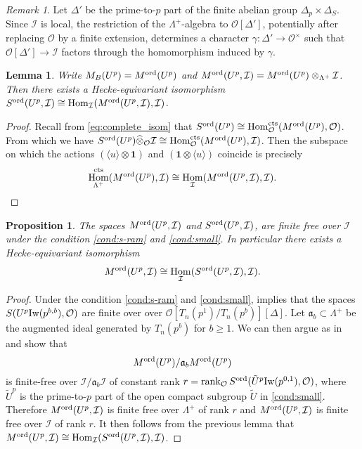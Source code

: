 \documentclass[leqno]{amsart}
\newtheorem{lem}[thm]{Lemma}
\newtheorem{prop}[thm]{Proposition}
\theoremstyle{definition}
\theoremstyle{remark}
\newtheorem{rem}[thm]{Remark}
\newcommand{\id}{\mathbf{1}}
\newcommand{\oo}{\mathcal{O}}
\DeclareMathOperator{\Hom}{Hom}
\newcommand{\cts}{\textnormal{cts}}
\newcommand{\fa}{\mathfrak{a}}
\newcommand{\Iw}{\textnormal{Iw}} %
\newcommand{\I}{\mathcal{I}} %
\newcommand{\ord}{\textnormal{ord}} %
\begin{document}
\begin{rem}
Let $\Delta'$ be the prime-to-$p$ part of the 
finite abelian group $\Delta_p\times \Delta_S$.
Since $\I$ is local,
the restriction of the $\Lambda^+$-algebra to $\oo[\Delta']$,
potentially after replacing $\oo$ by a finite extension,
determines a character 
$\gamma\colon\Delta'\to \oo^\times$
such that $\oo[\Delta']\to \I$
factors through the homomorphism induced by $\gamma$.

\end{rem}

\begin{lem}
    Write $M_B(U^p)=M^{\ord}(U^p)$
    and $M^{\ord}(U^p,\I)=M^{\ord}(U^p)\otimes_{\Lambda^+}\I$.
    Then there exists a Hecke-equivariant isomorphism
    $S^{\ord}(U^p,\I)\cong\Hom_\I(M^{\ord}(U^p,\I), \I)$.
\end{lem}
\begin{proof}
Recall from \eqref{eq:complete_isom} that
$S^{\ord}(U^p)\cong \Hom^{\cts}_\oo(M^{\ord}(U^p),\oo)$.
From which we have
$S^{\ord}(U^p)\widehat{\otimes}_\oo\I
\cong \Hom^{\cts}_\oo(M^{\ord}(U^p),\I)$.
Then the subspace on which the actions
$(\langle u\rangle\otimes\id)$ and
$(\id\otimes\langle u\rangle)$
coincide is precisely
\[
    \Hom^{\cts}_{\Lambda^+}(M^{\ord}(U^p),\I)\cong
    \Hom_{\I}(M^{\ord}(U^p,\I),\I).
\]
\end{proof}

\begin{prop} \label{prop:ord_to_dual}
The spaces $M^{\ord}(U^p,\I)$ and
$S^{\ord}(U^p,\I)$,
are finite free over $\I$
under the condition \eqref{cond:s-ram} and \eqref{cond:small}.
In particular there exists a Hecke-equivariant isomorphism
\[
    M^{\ord}(U^p,\I)\cong \Hom_\I(S^{\ord}(U^p,\I),\I).
\]
\end{prop}

\begin{proof}
Under the condition \eqref{cond:s-ram} and \eqref{cond:small},
\cite[Lem 2.6]{ger} implies that  the spaces 
$S(U^p\Iw(p^{b,b}),\oo)$ are finite over over 
$\oo[T_n(p^1)/T_n(p^b)][\Delta]$.
Let $\fa_b\subset\Lambda^+$
be the augmented ideal generated by $T_n(p^b)$ for $b\geq1$.
We can then argue as in \cite[Prop 2.20]{ger} and show that
\[
    M^{\ord}(U^p)/\fa_b M^{\ord}(U^p)
\]
is finite-free over $\I/\fa_b\I$
of constant rank
$r=\operatorname{rank}_\oo S^{\ord}(\tilde{U}^p\Iw(p^{0,1}),\oo)$,
where $\tilde{U}^p$ is the prime-to-$p$ part
of the open compact subgroup $\tilde{U}$ in \eqref{cond:small}.
Therefore $M^{\ord}(U^p,\I)$ is finite free over $\Lambda^+$
of rank $r$ and 
$M^{\ord}(U^p,\I)$ is finite free over $\I$ of rank $r$.
It then follows from the previous lemma that 
$M^{\ord}(U^p,\I)\cong \Hom_\I(S^{\ord}(U^p,\I),\I)$.

\end{proof}
\end{document}
